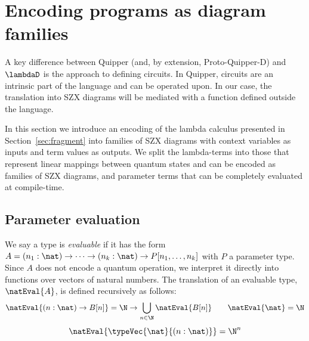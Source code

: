 \section{Encoding programs as diagram families}%
\label{sec:translation}

A key difference between Quipper (and, by extension, Proto-Quipper-D) and $\lambdaD$ is the approach to defining circuits. In Quipper, circuits are an intrinsic part of the language and can be operated upon. In our case, the translation into SZX diagrams will be mediated with a function defined outside the language.

In this section we introduce an encoding of the lambda calculus presented in Section~\ref{sec:fragment}
into families of SZX diagrams with context variables as inputs and term values as outputs.
We split the lambda-terms into those that represent linear mappings between quantum states
and can be encoded as families of SZX diagrams, and parameter terms that can be completely evaluated
at compile-time.

\subsection{Parameter evaluation}

We say a type is \textit{evaluable} if it has the form 
$A = (n_1:\nat) \to \dots \to (n_k:\nat) \to P[n_1,\dots,n_k]$ with $P$ a parameter type.
Since $A$ does not encode a quantum operation,
we interpret it directly into functions over vectors of natural numbers.
The translation of an evaluable type, $\natEval{A}$, is defined recursively as follows:
\[
    \natEval{(n : \nat) \to B[n]} = \N \to \bigcup_{n \in \N} \natEval{B[n]}
    \qquad
    \natEval{\nat} = \N
\]
\[
    \natEval{\typeVec{\nat}{(n : \nat)}} = \N^n
\]

